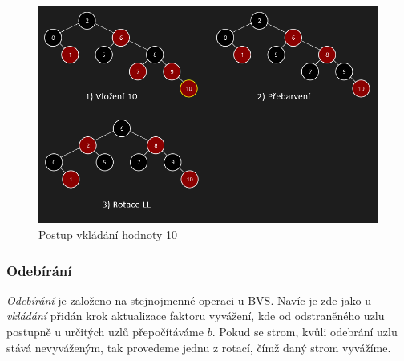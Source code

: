 \documentclass[
  biblatex=false,
  font=serif,
  glossaries=false,
  tables=false,
  theorems=false,
  index
]{kidiplom}
\begin{document}
\begin{figure}[h!]
\centering
	\includegraphics[scale=0.55]{obrazky/24CCVlozeni.png}
	\caption{Postup vkládání hodnoty 10}
\end{figure}

\subsubsection{Odebírání}
\indent\indent \textit{Odebírání} je založeno na stejnojmenné operaci u BVS. Navíc je zde jako u \textit{vkládání} přidán krok aktualizace faktoru vyvážení, kde od odstraněného uzlu postupně u určitých uzlů přepočítáváme $b$. Pokud se strom, kvůli odebrání uzlu stává nevyváženým, tak provedeme jednu z rotací, čímž daný strom vyvážíme. 
\end{document}
